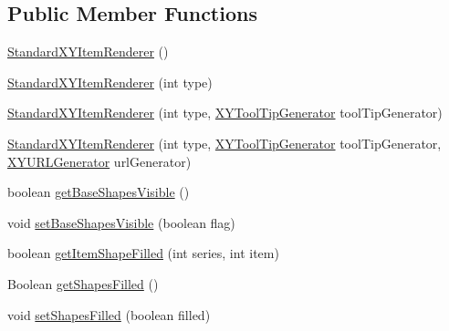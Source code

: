 \subsection*{Public Member Functions}
\begin{DoxyCompactItemize}
\item 
\mbox{\hyperlink{classorg_1_1jfree_1_1chart_1_1renderer_1_1xy_1_1_standard_x_y_item_renderer_a198d99b697471a2359f0c0fb79c30d2c}{Standard\+X\+Y\+Item\+Renderer}} ()
\item 
\mbox{\hyperlink{classorg_1_1jfree_1_1chart_1_1renderer_1_1xy_1_1_standard_x_y_item_renderer_a0625850ca4786690c65a90dbcfcf0c7a}{Standard\+X\+Y\+Item\+Renderer}} (int type)
\item 
\mbox{\hyperlink{classorg_1_1jfree_1_1chart_1_1renderer_1_1xy_1_1_standard_x_y_item_renderer_a853b3e9e17d9d3c493b40fd4472e105b}{Standard\+X\+Y\+Item\+Renderer}} (int type, \mbox{\hyperlink{interfaceorg_1_1jfree_1_1chart_1_1labels_1_1_x_y_tool_tip_generator}{X\+Y\+Tool\+Tip\+Generator}} tool\+Tip\+Generator)
\item 
\mbox{\hyperlink{classorg_1_1jfree_1_1chart_1_1renderer_1_1xy_1_1_standard_x_y_item_renderer_ac15ad61a66b81408afc0e616be8a1e5c}{Standard\+X\+Y\+Item\+Renderer}} (int type, \mbox{\hyperlink{interfaceorg_1_1jfree_1_1chart_1_1labels_1_1_x_y_tool_tip_generator}{X\+Y\+Tool\+Tip\+Generator}} tool\+Tip\+Generator, \mbox{\hyperlink{interfaceorg_1_1jfree_1_1chart_1_1urls_1_1_x_y_u_r_l_generator}{X\+Y\+U\+R\+L\+Generator}} url\+Generator)
\item 
boolean \mbox{\hyperlink{classorg_1_1jfree_1_1chart_1_1renderer_1_1xy_1_1_standard_x_y_item_renderer_aba0be76a4c0d8a7921f8e87235d6ed6a}{get\+Base\+Shapes\+Visible}} ()
\item 
void \mbox{\hyperlink{classorg_1_1jfree_1_1chart_1_1renderer_1_1xy_1_1_standard_x_y_item_renderer_a6bf86f870ebd05fcf10790431c04f29f}{set\+Base\+Shapes\+Visible}} (boolean flag)
\item 
boolean \mbox{\hyperlink{classorg_1_1jfree_1_1chart_1_1renderer_1_1xy_1_1_standard_x_y_item_renderer_ad12f0540f89e0c8c091f81a6503d509f}{get\+Item\+Shape\+Filled}} (int series, int item)
\item 
Boolean \mbox{\hyperlink{classorg_1_1jfree_1_1chart_1_1renderer_1_1xy_1_1_standard_x_y_item_renderer_acf250632e448f82dad856f22401abd12}{get\+Shapes\+Filled}} ()
\item 
void \mbox{\hyperlink{classorg_1_1jfree_1_1chart_1_1renderer_1_1xy_1_1_standard_x_y_item_renderer_add4dc69ddfaab56d17c0ed6e2984a4c1}{set\+Shapes\+Filled}} (boolean filled)

\end{DoxyCompactItemize}
